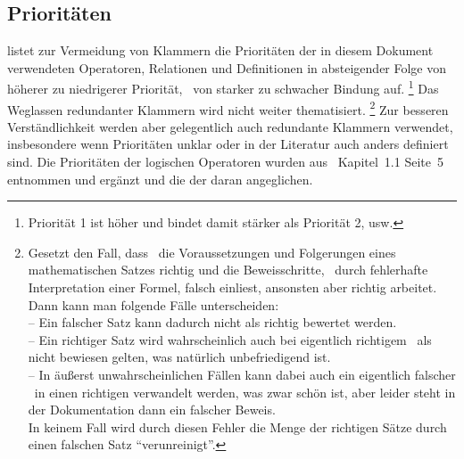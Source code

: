 \subsection{Prioritäten}%
\label{sub:Prioritäten}

 listet zur Vermeidung von Klammern die Prioritäten der in diesem Dokument verwendeten Operatoren, Relationen und Definitionen in absteigender Folge von höherer zu niedrigerer Priorität, \textdh\ von starker zu schwacher Bindung auf.%
\footnote{Priorität 1 ist höher und bindet damit stärker als Priorität 2, usw.}
Das Weglassen redundanter Klammern wird  nicht weiter thematisiert.%
\footnote{%
	Gesetzt den Fall, dass \ASBA\ die Voraussetzungen und Folgerungen eines mathematischen Satzes richtig und die Beweisschritte, \textzB\ durch fehlerhafte Interpretation einer Formel, falsch einliest, ansonsten aber richtig arbeitet.
	Dann kann man folgende Fälle unterscheiden:\\
	-- Ein falscher Satz kann dadurch nicht als richtig bewertet werden.\\
	-- Ein richtiger Satz wird wahrscheinlich auch bei eigentlich richtigem \Beweis\ als nicht bewiesen gelten, was natürlich unbefriedigend ist.\\
	-- In äußerst unwahrscheinlichen Fällen kann dabei auch ein eigentlich falscher \Beweis\ in einen richtigen verwandelt werden, was zwar schön ist, aber leider steht in der Dokumentation dann ein falscher Beweis.\\
	In keinem Fall wird durch diesen Fehler die Menge der richtigen Sätze durch einen falschen Satz \enquote{verunreinigt}.
}
Zur besseren Verständlichkeit werden aber gelegentlich auch redundante Klammern verwendet, insbesondere wenn Prioritäten unklar oder in der Literatur auch anders definiert sind.
Die Prioritäten der logischen Operatoren wurden aus~\cite{bib:Rautenberg} Kapitel~1.1 Seite~5 entnommen und ergänzt und die der  daran angeglichen.

